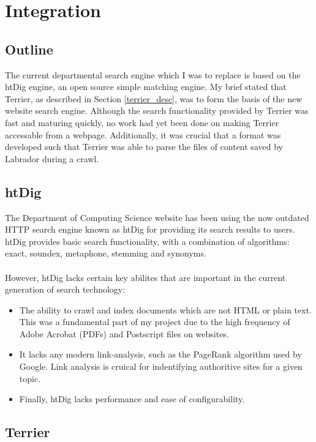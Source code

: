 \chapter{Integration}\label{chp-int}
\section{Outline}
The current departmental search engine which I was to replace is based on the htDig engine, an open source simple matching engine. My brief stated that Terrier, as described in Section \ref{terrier_desc}, was to form the basis of the new website search engine. Although the search functionality provided by Terrier was fast and maturing quickly, no work had yet been done on making Terrier accessable from a webpage. Additionally, it was crucial that a format was developed such that Terrier was able to parse the files of content saved by Labrador during a crawl.

\section{htDig}
The Department of Computing Science website has been using the now outdated HTTP search engine known as htDig\cite{web1} for providing its search results to users. htDig provides basic search functionality, with a combination of algorithms: exact, soundex, metaphone, stemming and synonyms.\\
\ \\
However, htDig lacks certain key abilites that are important in the current generation of search technology:
\begin{itemize}
\item{The ability to crawl and index documents which are not HTML or plain text. This was a fundamental part of my project due to the high frequency of Adobe Acrobat (PDFs) and Postscript files on websites.}
\item{It lacks any modern link-analysis, such as the PageRank\cite{Lawrence981} algorithm used by Google\cite{ref7}. Link analysis is cruical for indentifying authoritive sites for a given topic.}
\item{Finally, htDig lacks performance and ease of configurability.}
\end{itemize}	

\section{Terrier}
